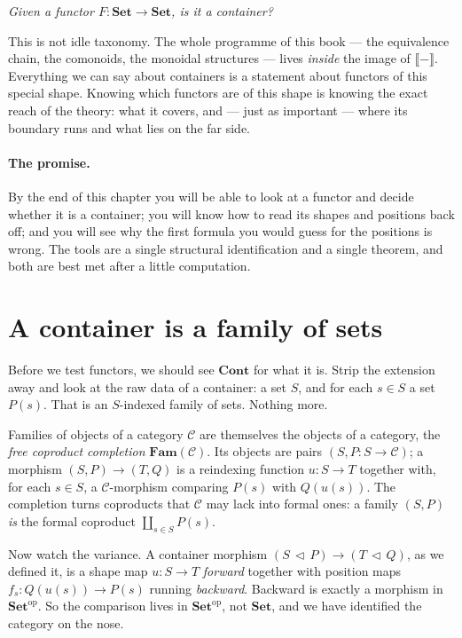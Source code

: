 \documentclass[11pt]{article}
\theoremstyle{plain}
\theoremstyle{definition}
\newcommand{\Set}{\mathbf{Set}}
\newcommand{\Cont}{\mathbf{Cont}}
\newcommand{\Fam}{\mathbf{Fam}}
\newcommand{\op}{^{\mathrm{op}}}
\newcommand{\ext}[1]{\llbracket #1 \rrbracket}
\newcommand{\cont}[2]{(#1\,\triangleleft\,#2)}
\begin{document}
\begin{center}
\itshape Given a functor $F\colon\Set\to\Set$, is it a container?
\end{center}

This is not idle taxonomy. The whole programme of this book --- the equivalence chain,
the comonoids, the monoidal structures --- lives \emph{inside} the image of $\ext{-}$.
Everything we can say about containers is a statement about functors of this special
shape. Knowing which functors are of this shape is knowing the exact reach of the
theory: what it covers, and --- just as important --- where its boundary runs and what
lies on the far side.

\paragraph{The promise.} By the end of this chapter you will be able to look at a
functor and decide whether it is a container; you will know how to read its shapes and
positions back off; and you will see why the first formula you would guess for the
positions is wrong. The tools are a single structural identification and a single
theorem, and both are best met after a little computation.

\section{A container is a family of sets}
\label{sec:fam}

Before we test functors, we should see $\Cont$ for what it is. Strip the extension
away and look at the raw data of a container: a set $S$, and for each $s\in S$ a set
$P(s)$. That is an $S$-indexed family of sets. Nothing more.

Families of objects of a category $\mathcal C$ are themselves the objects of a
category, the \emph{free coproduct completion} $\Fam(\mathcal C)$. Its objects are
pairs $(S, P\colon S\to\mathcal C)$; a morphism $(S,P)\to(T,Q)$ is a reindexing
function $u\colon S\to T$ together with, for each $s\in S$, a $\mathcal C$-morphism
comparing $P(s)$ with $Q(u(s))$. The completion turns coproducts that $\mathcal C$
may lack into formal ones: a family $(S,P)$ \emph{is} the formal coproduct
$\coprod_{s\in S}P(s)$.

Now watch the variance. A container morphism $\cont{S}{P}\to\cont{T}{Q}$, as we
defined it, is a shape map $u\colon S\to T$ \emph{forward} together with position maps
$f_s\colon Q(u(s))\to P(s)$ running \emph{backward}. Backward is exactly a morphism in
$\Set\op$. So the comparison lives in $\Set\op$, not $\Set$, and we have identified the
category on the nose.
\end{document}
